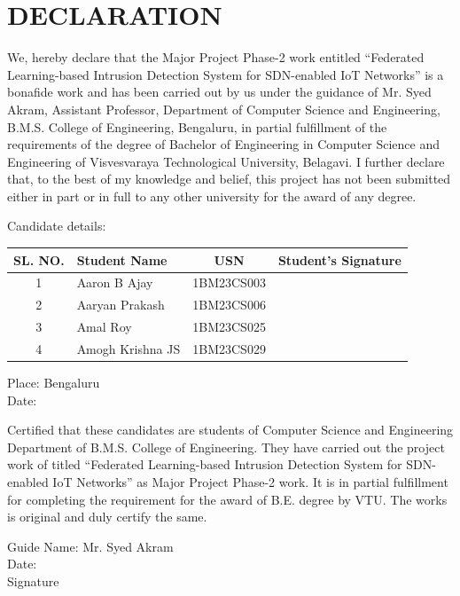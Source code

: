 \documentclass[12pt,a4paper]{report}
\begin{document}
\chapter*{DECLARATION}
\thispagestyle{empty}
We, hereby declare that the Major Project Phase-2 work entitled ``Federated Learning-based Intrusion Detection System for SDN-enabled IoT Networks'' is a bonafide work and has been carried out  by us under the guidance of Mr. Syed Akram, Assistant Professor, Department of  Computer Science and Engineering, B.M.S. College of Engineering, Bengaluru, in partial  fulfillment of the requirements of the degree of Bachelor of Engineering in Computer Science  and Engineering of Visvesvaraya Technological University, Belagavi.
I further declare that, to the best of my knowledge and belief, this project has not been  submitted either in part or in full to any other university for the award of any degree.
\vspace{0.3cm}
\begin{flushleft}
Candidate details:
\end{flushleft}
\vspace{0.1cm}
\begin{center}
\begin{tabular}{|c|l|c|c|}
\hline
\textbf{SL. NO.} & \textbf{Student Name} & \textbf{USN} & \textbf{Student’s Signature} \\
\hline
1 & Aaron B Ajay & 1BM23CS003 & \\
\hline
2 & Aaryan Prakash & 1BM23CS006 & \\
\hline
3 & Amal Roy  & 1BM23CS025 & \\
\hline
4 & Amogh Krishna JS & 1BM23CS029 & \\
\hline
\end{tabular}
\end{center}
\begin{flushleft}
Place: Bengaluru \\
Date: \\
\end{flushleft}
Certified that these candidates are students of Computer Science and Engineering Department  of B.M.S. College of Engineering. They have carried out the project work of titled ``Federated Learning-based Intrusion Detection System for SDN-enabled IoT Networks'' as Major Project Phase-2  work. It is in partial fulfillment for completing the requirement for the award of B.E. degree  by VTU. The works is original and duly certify the same.
\vspace{1cm}
\begin{flushleft}
Guide Name: Mr. Syed Akram \\
Date: \\
Signature \\
\end{flushleft}
\end{document}
